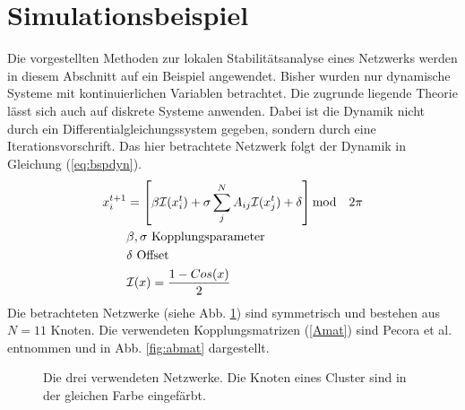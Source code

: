 \section{Simulationsbeispiel}
Die vorgestellten Methoden zur lokalen Stabilitätsanalyse eines Netzwerks werden in diesem Abschnitt auf ein Beispiel angewendet. Bisher wurden nur dynamische Systeme mit kontinuierlichen Variablen betrachtet. Die zugrunde liegende Theorie lässt sich auch auf diskrete Systeme anwenden. Dabei ist die Dynamik nicht durch ein Differentialgleichungssystem gegeben, sondern durch eine Iterationsvorschrift. Das hier betrachtete Netzwerk \cite{pecora2014} folgt der Dynamik in Gleichung (\ref{eq:bspdyn}).
\begin{align}
\label{eq:bspdyn}
	x_i^{t+1}&=\left[\beta\mathcal{I}(x_i^t)+\sigma \sum_j^N A_{ij}\mathcal{I}(x_j^t)+\delta\right] \text{mod}\quad 2\pi
	\\\notag & \beta,\sigma \text{ Kopplungsparameter}
	\\\notag  & \delta \text{ Offset}
	\\\notag &\mathcal{I}(x)=\frac{1-Cos(x)}{2}
\end{align}
Die betrachteten Netzwerke (siehe Abb. \ref{fig:cluster}) sind symmetrisch und bestehen aus $N=11$ Knoten. Die verwendeten Kopplungsmatrizen (\ref{Amat}) sind Pecora et al. \cite{pecora2014} entnommen und in Abb. \ref{fig:abmat} dargestellt. 
\begin{figure}
	 \centering
	 \caption[In der Simulation verwendete Netzwerke]{Die drei verwendeten Netzwerke. Die Knoten eines Cluster sind in der gleichen Farbe eingefärbt.}
	 \label{fig:cluster}
\end{figure}

